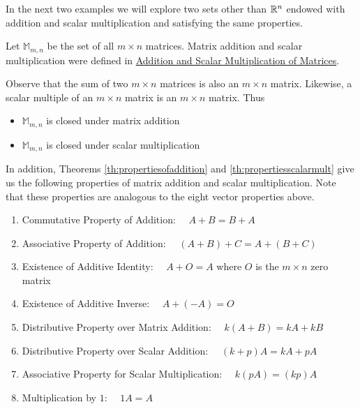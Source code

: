 \documentclass{ximera}
\begin{document}

In the next two examples we will explore two sets other than $\mathbb{R}^n$ endowed with addition and scalar multiplication and satisfying the same properties.

\begin{example}\label{ex:setofmatricesvectorspace}
Let $\mathbb{M}_{m,n}$ be the set of all $m\times n$ matrices.  Matrix addition and scalar multiplication were defined in \href{https://ximera.osu.edu/linearalgebradzv3/LinearAlgebraInteractiveIntro/MAT-0010/main}{Addition and Scalar Multiplication of Matrices}.

Observe that the sum of two $m\times n$ matrices is also an $m\times n$ matrix. Likewise, a scalar multiple of an $m\times n$ matrix is an $m\times n$ matrix.  Thus 
\begin{itemize}
    \item[] $\mathbb{M}_{m,n}$ is closed under matrix addition
    \item[] $\mathbb{M}_{m,n}$ is closed under scalar multiplication
\end{itemize}

In addition, Theorems \ref{th:propertiesofaddition} and \ref{th:propertiesscalarmult} give us the following properties of matrix addition and scalar multiplication.  Note that these properties are analogous to the eight vector properties above.
\begin{enumerate}
  \item 
  Commutative Property of Addition:  $\quad A+B=B+A$
  \item 
  Associative Property of Addition: $\quad (A+B)+C=A+(B+C)$
  \item 
  Existence of Additive Identity:  $\quad A+O=A$ where $O$ is the $m \times n$ zero matrix
  \item 
  Existence of Additive Inverse:  $\quad A+(-A)=O$
  \item
  Distributive Property over Matrix Addition:  $\quad k(A+B)=kA+kB$
  \item
  Distributive Property over Scalar Addition:  $\quad (k+p)A=kA+pA$
  \item 
  Associative Property for Scalar Multiplication: $\quad k(pA)=(kp)A$
  \item 
  Multiplication by $1$: $\quad 1A=A$
  \end{enumerate}
\end{example}
\end{document}
